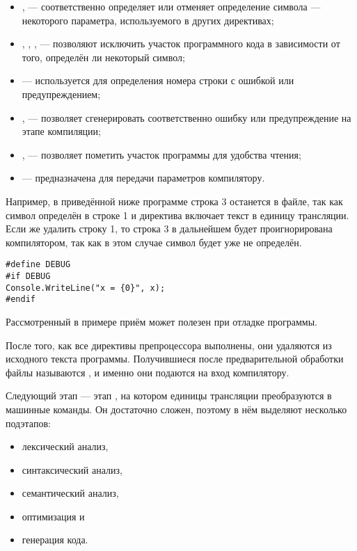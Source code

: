 \begin{itemize}
\item {},  — соответственно определяет или
  отменяет определение символа — некоторого параметра, используемого в
  других директивах;
\item {}, , ,  —
  позволяют исключить участок программного кода в зависимости от того,
  определён ли некоторый символ;
\item {} — используется для определения номера строки с
  ошибкой или предупреждением;
\item {},  — позволяет сгенерировать
  соответственно ошибку или предупреждение на этапе компиляции;
\item {},  — позволяет пометить участок
  программы для удобства чтения;
\item {} — предназначена для передачи параметров
  компилятору.
\end{itemize}

Например, в приведённой ниже программе строка 3 останется в файле, так
как символ  определён в строке 1 и директива
 включает текст в единицу трансляции. Если же удалить
строку 1, то строка 3 в дальнейшем будет проигнорирована компилятором,
так как в этом случае символ  будет уже не определён.

\begin{lstlisting}
#define DEBUG
#if DEBUG
Console.WriteLine("x = {0}", x);
#endif
\end{lstlisting}

Рассмотренный в примере приём может полезен при отладке программы.

После того, как все директивы препроцессора выполнены, они удаляются
из исходного текста программы. Получившиеся после предварительной
обработки файлы называются , и именно они подаются на вход компилятору.


Следующий этап — этап , на котором
единицы трансляции преобразуются в машинные команды. Он достаточно
сложен, поэтому в нём выделяют несколько подэтапов:

\begin{itemize}
\item лексический анализ,
\item синтаксический анализ,
\item семантический анализ,
\item оптимизация и
\item генерация кода.
\end{itemize}

